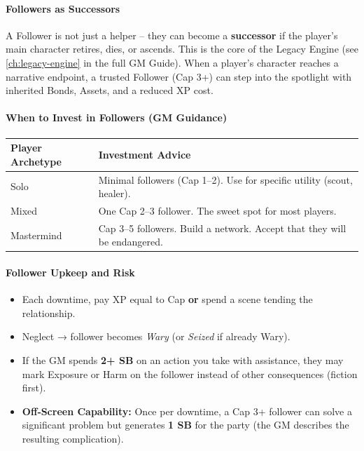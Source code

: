 \paragraph{Followers as Successors}
A Follower is not just a helper – they can become a \textbf{successor} if the player’s main character retires, dies, or ascends. This is the core of the Legacy Engine (see \ref{ch:legacy-engine} in the full GM Guide). When a player’s character reaches a narrative endpoint, a trusted Follower (Cap 3+) can step into the spotlight with inherited Bonds, Assets, and a reduced XP cost.

\paragraph{When to Invest in Followers (GM Guidance)}
\begin{tcolorbox}[title=When to Invest in Followers, colback=white!97!gray, colframe=black!80!gray]
\begin{tabularx}{\textwidth}{lX}
\toprule
\textbf{Player Archetype} & \textbf{Investment Advice} \\
\midrule
Solo & Minimal followers (Cap 1–2). Use for specific utility (scout, healer). \\
Mixed & One Cap 2–3 follower. The sweet spot for most players. \\
Mastermind & Cap 3–5 followers. Build a network. Accept that they will be endangered. \\
\bottomrule
\end{tabularx}
\end{tcolorbox}

\paragraph{Follower Upkeep and Risk}
\begin{itemize}
  \item Each downtime, pay XP equal to Cap \textbf{or} spend a scene tending the relationship.
  \item Neglect → follower becomes \textit{Wary} (or \textit{Seized} if already Wary).
  \item If the GM spends \textbf{2+ SB} on an action you take with assistance, they may mark Exposure or Harm on the follower instead of other consequences (fiction first).
  \item \textbf{Off‑Screen Capability:} Once per downtime, a Cap 3+ follower can solve a significant problem but generates \textbf{1 SB} for the party (the GM describes the resulting complication).
\end{itemize}

